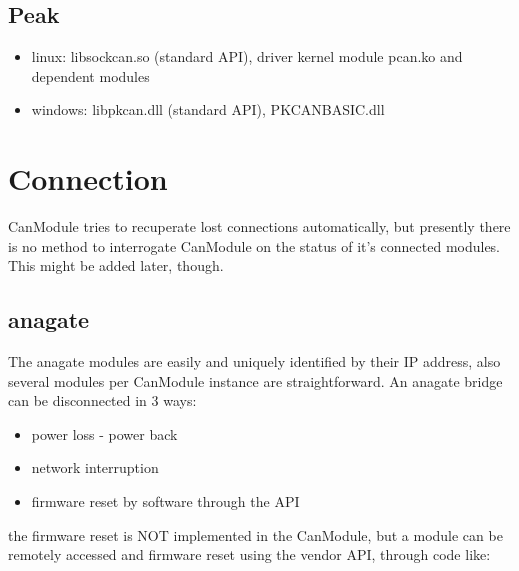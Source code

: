 \documentclass[letterpaper,10pt,english]{sphinxmanual}
\begin{document}
\section{Peak}
\label{\detokenize{running:peak}}\begin{itemize}
\item {} 
linux: libsockcan.so (standard API), driver kernel module pcan.ko and dependent modules

\item {} 
windows: libpkcan.dll (standard API), PKCANBASIC.dll

\end{itemize}


\chapter{Connection}
\label{\detokenize{connection:connection}}\label{\detokenize{connection::doc}}
CanModule tries to recuperate lost connections automatically, but presently there is no method
to interrogate CanModule on the status of it’s connected modules. This might be added later, though.


\section{anagate}
\label{\detokenize{connection:anagate}}
The anagate modules are easily and uniquely identified by their IP address, also several modules
per CanModule instance are straightforward. An anagate bridge can be disconnected in 3 ways:
\begin{itemize}
\item {} 
power loss - power back

\item {} 
network interruption

\item {} 
firmware reset by software through the API

\end{itemize}

the firmware reset is NOT implemented in the CanModule, but a module can be remotely accessed and
firmware reset using the vendor API, through code like:

\begin{sphinxVerbatim}[commandchars=\\\{\}]
    
      
\end{sphinxVerbatim}
\end{document}
